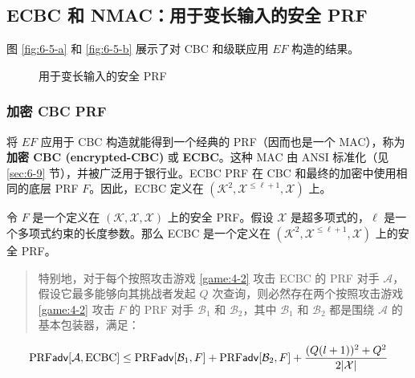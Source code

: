 \subsection{ECBC 和 NMAC：用于变长输入的安全 PRF}

图 \ref{fig:6-5-a} 和 \ref{fig:6-5-b} 展示了对 CBC 和级联应用 $EF$ 构造的结果。

\begin{figure}
  \centering
  
  \caption{用于变长输入的安全 PRF}
\end{figure}

\subsubsection{加密 CBC PRF}

将 $EF$ 应用于 CBC 构造就能得到一个经典的 PRF（因而也是一个 MAC），称为\textbf{加密 CBC (encrypted-CBC)} 或 \textbf{ECBC}。这种 MAC 由 ANSI 标准化（见 \ref{sec:6-9} 节），并被广泛用于银行业。ECBC PRF 在 CBC 和最终的加密中使用相同的底层 PRF $F$。因此，ECBC 定义在 $(\mathcal{K}^2,\mathcal{X}^{\leq\ell+1},\mathcal{X})$ 上。

\begin{theorem}\label{theo:6-6}
令 $F$ 是一个定义在 $(\mathcal{K},\mathcal{X},\mathcal{X})$ 上的安全 PRF。假设 $\mathcal{X}$ 是超多项式的，$\ell$ 是一个多项式约束的长度参数。那么 ECBC 是一个定义在 $(\mathcal{K}^2,\mathcal{X}^{\leq\ell+1},\mathcal{X})$ 上的安全 PRF。
\begin{quote}
特别地，对于每个按照攻击游戏 \ref{game:4-2} 攻击 ECBC 的 PRF 对手 $\mathcal{A}$，假设它最多能够向其挑战者发起 $Q$ 次查询，则必然存在两个按照攻击游戏 \ref{game:4-2} 攻击 $F$ 的 PRF 对手 $\mathcal{B}_1$ 和 $\mathcal{B}_2$，其中 $\mathcal{B}_1$ 和 $\mathcal{B}_2$ 都是围绕 $\mathcal{A}$ 的基本包装器，满足：
\end{quote}
\begin{equation}\label{eq:6-19}
{\rm PRF}\mathsf{adv}[\mathcal{A},{\rm ECBC}]\leq{\rm PRF}\mathsf{adv}[\mathcal{B}_1,F]+{\rm PRF}\mathsf{adv}[\mathcal{B}_2,F]+\frac{(Q(l+1))^2+Q^2}{2|\mathcal{X}|}
\end{equation}
\end{theorem}

